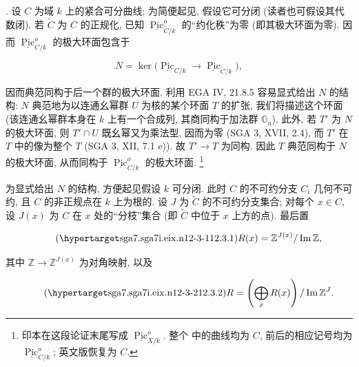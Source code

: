 
\medskip
\noindent
{}. 设 $C$ 为域 $k$ 上的紧合可分曲线; 为简便起见, 假设它可分闭 (读者也可假设其代数闭). 若 $\widetilde C$ 为 $C$ 的正规化, 已知 $\underline{\operatorname{Pic}}^o_{\widetilde C/k}$ 的“约化秩”为零 (即其极大环面为零). 因而 $\underline{\operatorname{Pic}}^o_{C/k}$ 的极大环面包含于

\begin{equation*}
 N=\ker\bigl(\underline{\operatorname{Pic}}_{C/k}
       \longrightarrow\underline{\operatorname{Pic}}_{\widetilde C/k}\bigr),
\end{equation*}

\noindent
因而典范同构于后一个群的极大环面. 利用 EGA IV, 21.8.5 容易显式给出 $N$ 的结构: $N$ 典范地为以连通幺幂群 $U$ 为核的某个环面 $T$ 的扩张, 我们将描述这个环面 (该连通幺幂群本身在 $k$ 上有一个合成列, 其商同构于加法群 $\mathbb G_a$). 此外, 若 $T'$ 为 $N$ 的极大环面, 则 $T'\cap U$ 既幺幂又为乘法型, 因而为零 (SGA 3, XVII, 2.4), 而 $T'$ 在 $T$ 中的像为整个 $T$ (SGA 3, XII, 7.1 e)). 故 $T'\to T$ 为同构. 因此 $T$ 典范同构于 $N$ 的极大环面, 从而同构于 $\underline{\operatorname{Pic}}^o_{C/k}$ 的极大环面.
\footnote{印本在这段论证末尾写成 $\underline{\operatorname{Pic}}^o_{X/k}$. 整个  中的曲线均为 $C$, 前后的相应记号均为 $\underline{\operatorname{Pic}}^o_{C/k}$; 英文版恢复为 $C$.}

为显式给出 $N$ 的结构, 方便起见假设 $k$ 可分闭. 此时 $C$ 的不可约分支 $C_i$ 几何不可约, 且 $C$ 的非正规点在 $k$ 上为根的. 设 $J$ 为 $\widetilde C$ 的不可约分支集合; 对每个 $x\in C$, 设 $J(x)$ 为 $C$ 在 $x$ 处的“分枝”集合 (即 $\widetilde C$ 中位于 $x$ 上方的点). 最后置

\begin{equation}\tag{\SGARefTarget{sga7.sga7i.eix.n12-3-1}{12.3.1}}
 R(x)=\mathbb Z^{J(x)}/\operatorname{Im}\mathbb Z,
\end{equation}

\noindent
其中 $\mathbb Z\to\mathbb Z^{J(x)}$ 为对角映射, 以及

\begin{equation}\tag{\SGARefTarget{sga7.sga7i.eix.n12-3-2}{12.3.2}}
 R=\left(\bigoplus_x R(x)\right)/\operatorname{Im}\mathbb Z^J.
\end{equation}

